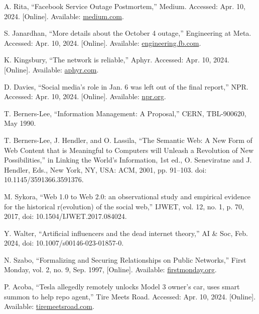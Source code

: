 \documentclass{article}
\begin{document}
\begin{thebibliography}{99}
    A. Rita, “Facebook Service Outage Postmortem,” Medium. Accessed: Apr. 10, 2024. [Online]. Available: \href{https://medium.com/@egwuaturita95/facebook-service-outage-
    postmortem-479cd1a3a6f8}{medium.com}.

    S. Janardhan, “More details about the October 4 outage,” Engineering at Meta. Accessed:
    Apr. 10, 2024. [Online]. Available: \href{https://engineering.fb.com/2021/10/05/networking-
    traffic/outage-details/}{engineering.fb.com}.

    K. Kingsbury, “The network is reliable,” Aphyr. Accessed: Apr. 10, 2024. [Online]. Available: \href{https://aphyr.com/posts/288-the-network-is-reliable}{aphyr.com}.

    D. Davies, “Social media’s role in Jan. 6 was left out of the final report,” NPR. Accessed: Apr. 10, 2024. [Online]. Available: \href{https://www.npr.org/2023/01/26/1151360750/social-medias-role-in-jan-6-was-left-out-of-the-final-report}{npr.org}.

    T. Berners-Lee, “Information Management: A Proposal,” CERN, TBL-900620, May 1990.

    T. Berners-Lee, J. Hendler, and O. Lassila, “The Semantic Web: A New Form of Web Content that is Meaningful to Computers will Unleash a Revolution of New Possibilities,” in Linking the World’s Information, 1st ed., O. Seneviratne and J. Hendler, Eds., New York, NY, USA: ACM, 2001, pp. 91–103. doi: 10.1145/3591366.3591376.

    M. Sykora, “Web 1.0 to Web 2.0: an observational study and empirical evidence for the historical r(evolution) of the social web,” IJWET, vol. 12, no. 1, p. 70, 2017, doi: 10.1504/IJWET.2017.084024.

    Y. Walter, “Artificial influencers and the dead internet theory,” AI \& Soc, Feb. 2024, doi: 10.1007/s00146-023-01857-0.

    N. Szabo, “Formalizing and Securing Relationships on Public Networks,” First Monday, vol. 2, no. 9, Sep. 1997, [Online]. Available: \href{https://firstmonday.org/ojs/index.php/fm/article/view/548/469}{firstmonday.org}.
    
    P. Acoba, “Tesla allegedly remotely unlocks Model 3 owner’s car, uses smart summon to help repo agent,” Tire Meets Road. Accessed: Apr. 10, 2024. [Online]. Available: \href{https://tiremeetsroad.com/2021/03/18/tesla-allegedly-remotely-unlocks-model-3-owners-
    car-uses-smart-summon-to-help-repo-agent/}{tiremeetsroad.com}.


\end{thebibliography}
\end{document}
